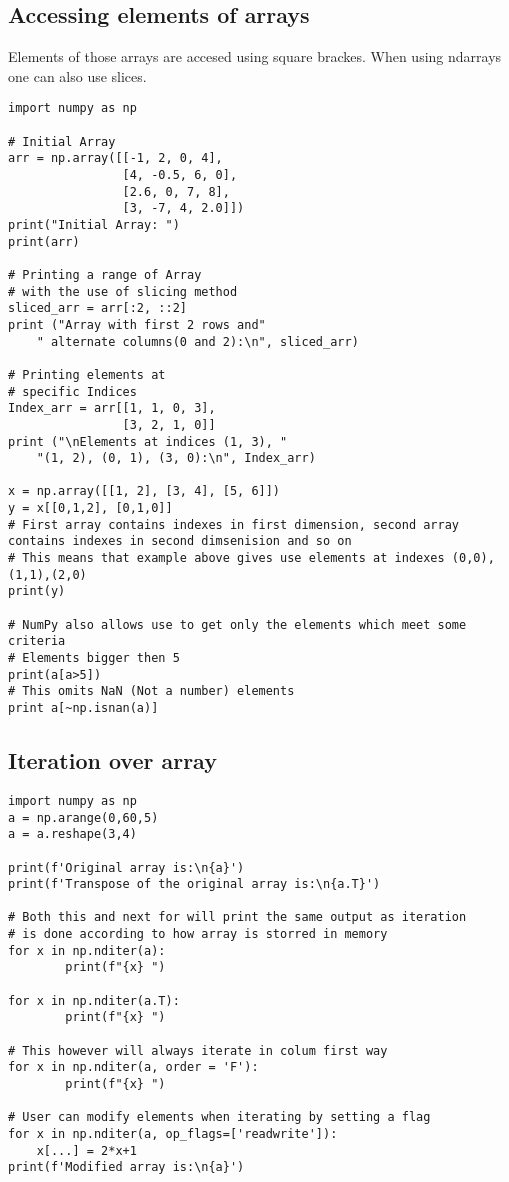 \documentclass{article}
\begin{document}
\subsection{Accessing elements of arrays}
Elements of those arrays are accesed using square brackes.
When using ndarrays one can also use slices.
\begin{lstlisting}
import numpy as np

# Initial Array
arr = np.array([[-1, 2, 0, 4],
                [4, -0.5, 6, 0],
                [2.6, 0, 7, 8],
                [3, -7, 4, 2.0]])
print("Initial Array: ")
print(arr)
  
# Printing a range of Array
# with the use of slicing method
sliced_arr = arr[:2, ::2]
print ("Array with first 2 rows and"
    " alternate columns(0 and 2):\n", sliced_arr)

# Printing elements at
# specific Indices
Index_arr = arr[[1, 1, 0, 3],
                [3, 2, 1, 0]]
print ("\nElements at indices (1, 3), "
    "(1, 2), (0, 1), (3, 0):\n", Index_arr)

x = np.array([[1, 2], [3, 4], [5, 6]])
y = x[[0,1,2], [0,1,0]] 
# First array contains indexes in first dimension, second array contains indexes in second dimsenision and so on
# This means that example above gives use elements at indexes (0,0),(1,1),(2,0)
print(y)

# NumPy also allows use to get only the elements which meet some criteria
# Elements bigger then 5
print(a[a>5])
# This omits NaN (Not a number) elements
print a[~np.isnan(a)]
\end{lstlisting}
\subsection{Iteration over array}
\begin{lstlisting}
import numpy as np
a = np.arange(0,60,5)
a = a.reshape(3,4)

print(f'Original array is:\n{a}')
print(f'Transpose of the original array is:\n{a.T}')

# Both this and next for will print the same output as iteration
# is done according to how array is storred in memory
for x in np.nditer(a):
        print(f"{x} ")

for x in np.nditer(a.T):
        print(f"{x} ")

# This however will always iterate in colum first way
for x in np.nditer(a, order = 'F'):
        print(f"{x} ")

# User can modify elements when iterating by setting a flag
for x in np.nditer(a, op_flags=['readwrite']):
    x[...] = 2*x+1
print(f'Modified array is:\n{a}')
\end{lstlisting}
\end{document}
